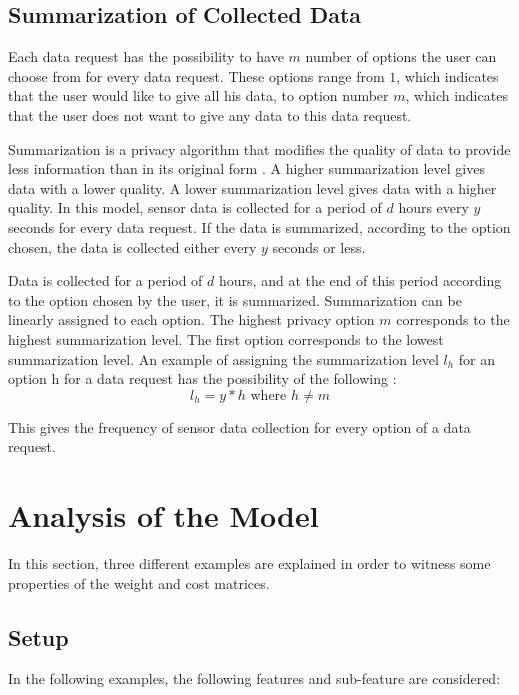 \subsection{Summarization of Collected Data} \label{summa}
Each data request has the possibility to have $m$ number of options the user can choose from for every data request. These options range from $1$, which indicates that the user would like to give all his data, to option number $m$, which indicates that the user does not want to give any data to this data request.

Summarization is a privacy algorithm that modifies the quality of data to provide less information than in its original form \cite{pournaras2016self}. A higher summarization level gives data with a lower quality. A lower summarization level gives data with a higher quality. In this model, sensor data is collected for a period of $d$ hours every $y$ seconds for every data request. If the data is summarized, according to the option chosen, the data is collected either every $y$ seconds or less.

Data is collected for a period of $d$ hours, and at the end of this period according to the option chosen by the user, it is summarized. Summarization can
be linearly assigned to each option.
The highest privacy option $m$ corresponds to the highest summarization level. The first option corresponds to the lowest summarization level. An example of assigning the summarization level $l_{h}$ for an option h for a data request has the possibility of the following :
\begin{equation}
l_{h} = y*h \text{ where } h \neq m
\end{equation}

This gives the frequency of sensor data collection for every option of a data request.

\section{Analysis of the Model} \label{analysis_model}
In this section, three different examples are explained in order to witness some properties of the weight and cost matrices.

\subsection{Setup}
In the following examples, the following features and sub-feature are considered:

